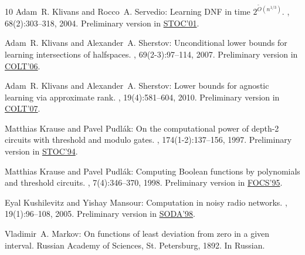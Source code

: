 \begin{thebibliography}{10}
{\sc Adam~R. Klivans and Rocco~A. Servedio}: Learning {DNF} in time {$2^{\tilde
  O(n^{1/3})}$}.
, 68(2):303--318, 2004.
\newblock Preliminary version in
  \href{http://dx.doi.org/10.1145/380752.380809}{STOC'01}.

{\sc Adam~R. Klivans and Alexander~A. Sherstov}: Unconditional lower bounds for
  learning intersections of halfspaces.
, 69(2-3):97--114, 2007.
\newblock Preliminary version in
  \href{http://dx.doi.org/10.1007/11776420_26}{COLT'06}.
\newblock [\epfmtdoi{10.1007/s10994-007-5010-1}]

{\sc Adam~R. Klivans and Alexander~A. Sherstov}: Lower bounds for agnostic
  learning via approximate rank.
, 19(4):581--604, 2010.
\newblock Preliminary version in
  \href{http://dx.doi.org/10.1007/978-3-540-72927-3_30}{COLT'07}.
\newblock [\epfmtdoi{10.1007/s00037-010-0296-y}]

{\sc Matthias Krause and Pavel Pudl{\'a}k}: On the computational power of
  depth-2 circuits with threshold and modulo gates.
, 174(1-2):137--156, 1997.
\newblock Preliminary version in
  \href{http://dx.doi.org/10.1145/195058.195103}{STOC'94}.
\newblock [\epfmtdoi{10.1016/S0304-3975(96)00019-9}]

{\sc Matthias Krause and Pavel Pudl{\'a}k}: Computing {B}oolean functions by
  polynomials and threshold circuits.
, 7(4):346--370, 1998.
\newblock Preliminary version in
  \href{http://dx.doi.org/10.1109/SFCS.1995.492670}{FOCS'95}.
\newblock [\epfmtdoi{10.1007/s000370050015}]

{\sc Eyal Kushilevitz and Yishay Mansour}: Computation in noisy radio networks.
, 19(1):96--108, 2005.
\newblock Preliminary version in
  \href{http://dl.acm.org/citation.cfm?id=314709}{SODA'98}.
\newblock [\epfmtdoi{10.1137/S0895480103434063}]

{\sc Vladimir~A. Markov}: On functions of least deviation from zero in a given
  interval.
\newblock Russian Academy of Sciences, St. Petersburg, 1892.
\newblock In Russian.


\end{thebibliography}
